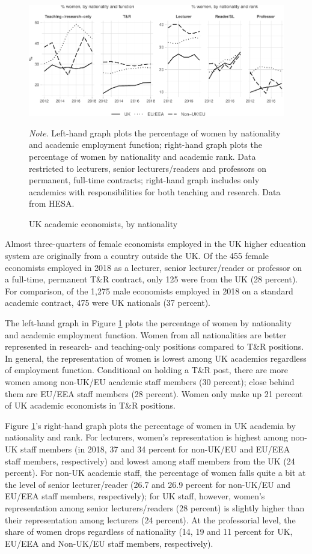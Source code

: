 \documentclass[a4paper, 1]{article}
\begin{document}
\begin{figure}
\centering
\includegraphics[width=\linewidth]{0-images/nationality-1.pdf}

\caption{UK academic economists, by nationality}
\label{fig:nationality}
\justify\footnotesize\textit{Note}.  Left-hand graph plots the percentage of women by nationality and academic employment function; right-hand graph plots the percentage of women by nationality and academic rank. Data restricted to lecturers, senior lecturers/readers and professors on permanent, full-time contracts; right-hand graph includes only academics with responsibilities for both teaching and research. Data from HESA.
\end{figure}



Almost three-quarters of female economists employed in the UK higher education system are originally from a country outside the UK. Of the 455 female economists employed in 2018 as a lecturer, senior lecturer/reader or professor on a full-time, permanent T\&R contract, only 125 were from the UK (28 percent). For comparison, of the 1,275 male economists employed in 2018 on a standard academic contract, 475 were UK nationals (37 percent).

The left-hand graph in Figure \ref{fig:nationality} plots the percentage of women by nationality and academic employment function. Women from all nationalities are better represented in research- and teaching-only positions compared to T\&R positions. In general, the representation of women is lowest among UK academics regardless of employment function. Conditional on holding a T\&R post, there are more women among non-UK/EU academic staff members (30 percent); close behind them are EU/EEA staff members (28 percent). Women only make up 21 percent of UK academic economists in T\&R positions.

Figure \ref{fig:nationality}'s right-hand graph plots the percentage of women in UK academia by nationality and rank. For lecturers, women's representation is highest among non-UK staff members (in 2018, 37 and 34 percent for non-UK/EU and EU/EEA staff members, respectively) and lowest among staff members from the UK (24 percent). For non-UK academic staff, the percentage of women falls quite a bit at the level of senior lecturer/reader (26.7 and 26.9 percent for non-UK/EU and EU/EEA staff members, respectively); for UK staff, however, women's representation among senior lecturers/readers (28 percent) is slightly higher than their representation among lecturers (24 percent). At the professorial level, the share of women drops regardless of nationality (14, 19 and 11 percent for UK, EU/EEA and Non-UK/EU staff members, respectively).
\end{document}
